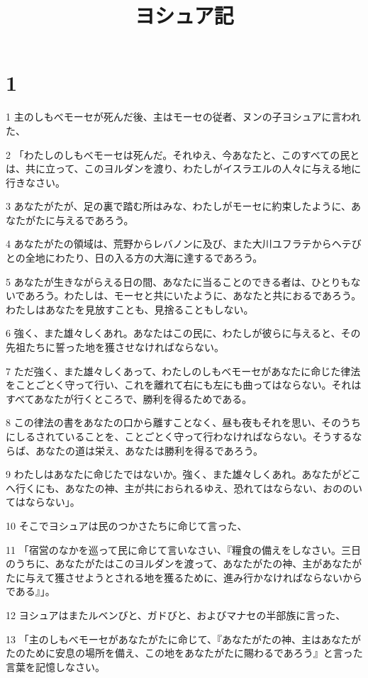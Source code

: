 

\title{ヨシュア記}


\chapter{1}

\par 1 主のしもべモーセが死んだ後、主はモーセの従者、ヌンの子ヨシュアに言われた、
\par 2 「わたしのしもべモーセは死んだ。それゆえ、今あなたと、このすべての民とは、共に立って、このヨルダンを渡り、わたしがイスラエルの人々に与える地に行きなさい。
\par 3 あなたがたが、足の裏で踏む所はみな、わたしがモーセに約束したように、あなたがたに与えるであろう。
\par 4 あなたがたの領域は、荒野からレバノンに及び、また大川ユフラテからヘテびとの全地にわたり、日の入る方の大海に達するであろう。
\par 5 あなたが生きながらえる日の間、あなたに当ることのできる者は、ひとりもないであろう。わたしは、モーセと共にいたように、あなたと共におるであろう。わたしはあなたを見放すことも、見捨ることもしない。
\par 6 強く、また雄々しくあれ。あなたはこの民に、わたしが彼らに与えると、その先祖たちに誓った地を獲させなければならない。
\par 7 ただ強く、また雄々しくあって、わたしのしもべモーセがあなたに命じた律法をことごとく守って行い、これを離れて右にも左にも曲ってはならない。それはすべてあなたが行くところで、勝利を得るためである。
\par 8 この律法の書をあなたの口から離すことなく、昼も夜もそれを思い、そのうちにしるされていることを、ことごとく守って行わなければならない。そうするならば、あなたの道は栄え、あなたは勝利を得るであろう。
\par 9 わたしはあなたに命じたではないか。強く、また雄々しくあれ。あなたがどこへ行くにも、あなたの神、主が共におられるゆえ、恐れてはならない、おののいてはならない」。
\par 10 そこでヨシュアは民のつかさたちに命じて言った、
\par 11 「宿営のなかを巡って民に命じて言いなさい、『糧食の備えをしなさい。三日のうちに、あなたがたはこのヨルダンを渡って、あなたがたの神、主があなたがたに与えて獲させようとされる地を獲るために、進み行かなければならないからである』」。
\par 12 ヨシュアはまたルベンびと、ガドびと、およびマナセの半部族に言った、
\par 13 「主のしもべモーセがあなたがたに命じて、『あなたがたの神、主はあなたがたのために安息の場所を備え、この地をあなたがたに賜わるであろう』と言った言葉を記憶しなさい。
